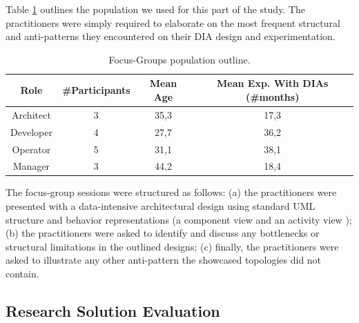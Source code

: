 \documentclass[smallextended]{svjour3}       %
\providecommand{\tabularnewline}{\\}
\newcommand{\todoMB}[2]{\linespread{0.7}\todo[color=yellow!50,#1]{\scriptsize\textbf{MB:}#2}}
\begin{document}
Table \ref{tabba} outlines the population we used for this part of the study. The practitioners were simply required to elaborate on the most frequent structural and anti-patterns they encountered on their DIA design and experimentation. 

\begin{table}
\caption{Focus-Groups population outline.}\label{tabba}
\begin{tabular}{|c|c|c|c|}
\hline 
\textbf{Role} & \textbf{\#Participants} & \textbf{Mean Age} & \textbf{Mean Exp. With DIAs (\#months)}\tabularnewline
\hline 
Architect & 3 & 35,3 & 17,3\tabularnewline
\hline 
Developer & 4 & 27,7 & 36,2\tabularnewline
\hline 
Operator & 5 & 31,1 & 38,1\tabularnewline
\hline 
Manager & 3 & 44,2 & 18,4\tabularnewline
\hline 
\end{tabular}
\end{table}

The focus-group sessions were structured as follows: (a) the practitioners were presented with a data-intensive architectural design using standard UML structure and behavior representations (a component view and an activity view \cite{NittoJGST16}); (b) the practitioners were asked to identify and discuss any bottlenecks or structural limitations in the outlined designs; (c) finally, the practitioners were asked to illustrate any other anti-pattern the showcased topologies did not contain.

%

\subsection{Research Solution Evaluation}\label{sec:researchsolutioneval}
\end{document}
